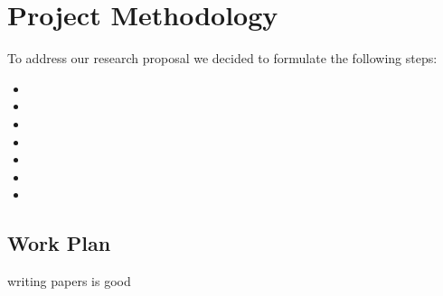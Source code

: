 \chapter{Project Methodology}
\label{ch04:methodology}

To address our research proposal we decided to formulate the following steps:

\begin{itemize}
\item
\item
\item
\item
\item
\item
\item
\end{itemize}


\section{Work Plan}
\label{sec:work-plan}

writing papers is good 

